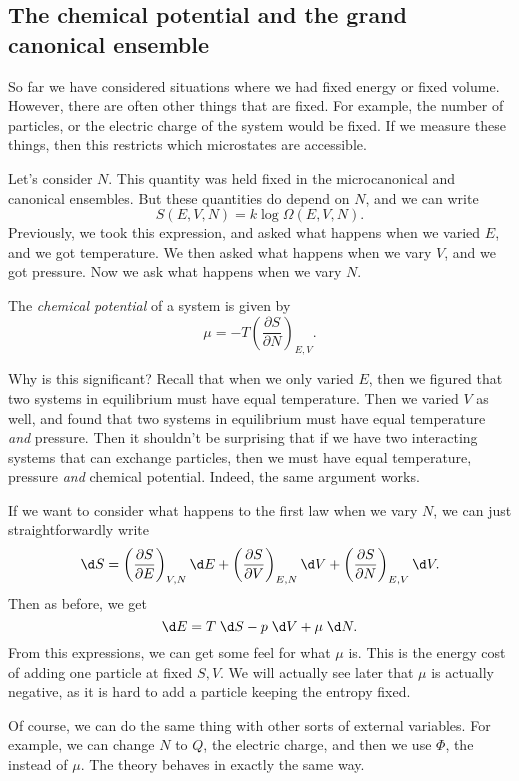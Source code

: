 \documentclass[a4paper]{article}
\begin{document}
\subsection{The chemical potential and the grand canonical ensemble}
So far we have considered situations where we had fixed energy or fixed volume. However, there are often other things that are fixed. For example, the number of particles, or the electric charge of the system would be fixed. If we measure these things, then this restricts which microstates are accessible.

Let's consider $N$. This quantity was held fixed in the microcanonical and canonical ensembles. But these quantities do depend on $N$, and we can write
\[
  S(E, V, N) = k \log \Omega(E, V, N).
\]
Previously, we took this expression, and asked what happens when we varied $E$, and we got temperature. We then asked what happens when we vary $V$, and we got pressure. Now we ask what happens when we vary $N$.
\begin{defi}
  The \emph{chemical potential} of a system is given by
  \[
    \mu = -T \left(\frac{\partial S}{\partial N}\right)_{E, V}.
  \]
\end{defi}

Why is this significant? Recall that when we only varied $E$, then we figured that two systems in equilibrium must have equal temperature. Then we varied $V$ as well, and found that two systems in equilibrium must have equal temperature \emph{and} pressure. Then it shouldn't be surprising that if we have two interacting systems that can exchange particles, then we must have equal temperature, pressure \emph{and} chemical potential. Indeed, the same argument works.

If we want to consider what happens to the first law when we vary $N$, we can just straightforwardly write
\[
  \d S = \left(\frac{\partial S}{\partial E}\right)_{V, N} \d E + \left(\frac{\partial S}{\partial V}\right)_{E, N} \d V + \left(\frac{\partial S}{\partial N}\right)_{E, V} \d V.
\]
Then as before, we get
\[
  \d E = T \;\d S - p \;\d V + \mu \;\d N.
\]
From this expressions, we can get some feel for what $\mu$ is. This is the energy cost of adding one particle at fixed $S, V$. We will actually see later that $\mu$ is actually negative, as it is hard to add a particle keeping the entropy fixed.

Of course, we can do the same thing with other sorts of external variables. For example, we can change $N$ to $Q$, the electric charge, and then we use $\Phi$, the  instead of $\mu$. The theory behaves in exactly the same way.
\end{document}
